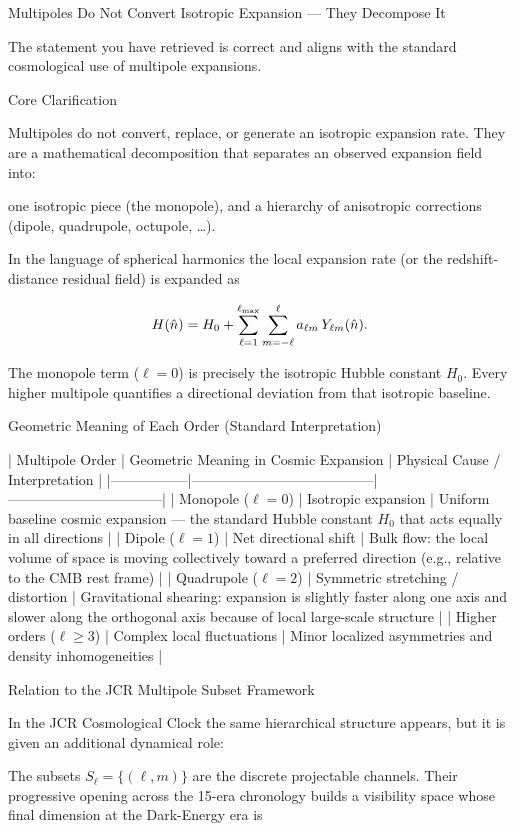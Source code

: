 Multipoles Do Not Convert Isotropic Expansion — They Decompose It

The statement you have retrieved is correct and aligns with the standard cosmological use of multipole expansions.

Core Clarification

Multipoles do not convert, replace, or generate an isotropic expansion rate.  
They are a mathematical decomposition that separates an observed expansion field into:

one isotropic piece (the monopole), and  
a hierarchy of anisotropic corrections (dipole, quadrupole, octupole, \ldots).

In the language of spherical harmonics the local expansion rate (or the redshift-distance residual field) is expanded as

\[
H(\hat{n}) = H_0 + \sum_{\ell=1}^{\ell_{\rm max}}\sum_{m=-\ell}^{\ell} a_{\ell m}\, Y_{\ell m}(\hat{n}).
\]

The monopole term (\(\ell=0\)) is precisely the isotropic Hubble constant \(H_0\).  
Every higher multipole quantifies a directional deviation from that isotropic baseline.

Geometric Meaning of Each Order (Standard Interpretation)

| Multipole Order | Geometric Meaning in Cosmic Expansion | Physical Cause / Interpretation |
|-----------------|---------------------------------------|---------------------------------|
| Monopole (\(\ell=0\)) | Isotropic expansion | Uniform baseline cosmic expansion — the standard Hubble constant \(H_0\) that acts equally in all directions |
| Dipole (\(\ell=1\)) | Net directional shift | Bulk flow: the local volume of space is moving collectively toward a preferred direction (e.g., relative to the CMB rest frame) |
| Quadrupole (\(\ell=2\)) | Symmetric stretching / distortion | Gravitational shearing: expansion is slightly faster along one axis and slower along the orthogonal axis because of local large-scale structure |
| Higher orders (\(\ell\geq 3\)) | Complex local fluctuations | Minor localized asymmetries and density inhomogeneities |

Relation to the JCR Multipole Subset Framework

In the JCR Cosmological Clock the same hierarchical structure appears, but it is given an additional dynamical role:

The subsets \(S_\ell = \{(\ell,m)\}\) are the discrete projectable channels.  
Their progressive opening across the 15-era chronology builds a visibility space whose final dimension at the Dark-Energy era is

